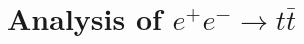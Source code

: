\documentclass[preprint]{elsarticle}
\newcommand{\qgsp}{{\sc qgsp\_bert}}
\newcommand{\ecal}{Si-W ECAL}
\newcommand{\tfa}{track-finding algorithm}
\newcommand{\ep}{$\varepsilon$ parameter}
\begin{document}



\clearpage


\section*{Analysis of $e^+e^-\rightarrow t\bar{t}$}
\end{document}
